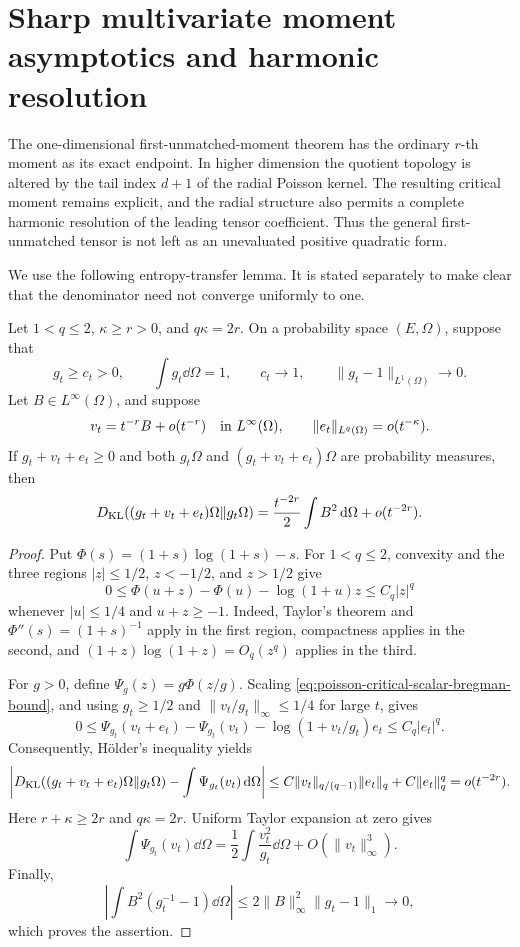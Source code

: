 \section{Sharp multivariate moment asymptotics and harmonic resolution}
\label{sec:poisson-harmonic-spectrum}

The one-dimensional first-unmatched-moment theorem has the ordinary
\(r\)-th moment as its exact endpoint.  In higher dimension the quotient
topology is altered by the tail index \(d+1\) of the radial Poisson kernel.
The resulting critical moment remains explicit, and the radial structure
also permits a complete harmonic resolution of the leading tensor
coefficient.  Thus the general first-unmatched tensor is not left as an
unevaluated positive quadratic form.

We use the following entropy-transfer lemma.  It is stated separately to
make clear that the denominator need not converge uniformly to one.

\begin{lemma}
\label{lem:poisson-critical-two-background-transfer}
Let \(1<q\le2\), \(\kappa\ge r>0\), and \(q\kappa=2r\).  On a probability
space \((E,\Omega)\), suppose that
\[
 g_t\ge c_t>0,\qquad \int g_t\dd\Omega=1,\qquad
 c_t\longrightarrow1,\qquad \|g_t-1\|_{L^1(\Omega)}\longrightarrow0.
\]
Let \(B\in L^\infty(\Omega)\), and suppose
\[
 v_t=t^{-r}B+o(t^{-r})\quad\hbox{in }L^\infty(\Omega),
 \qquad \|e_t\|_{L^q(\Omega)}=o(t^{-\kappa}).
\]
If \(g_t+v_t+e_t\ge0\) and both \(g_t\Omega\) and
\((g_t+v_t+e_t)\Omega\) are probability measures, then
\[
 D_{\rm KL}((g_t+v_t+e_t)\Omega\|g_t\Omega)
 =\frac{t^{-2r}}2\int B^2\,\mathrm{d}\Omega+o(t^{-2r}).
\]
\end{lemma}

\begin{proof}
Put \(\Phi(s)=(1+s)\log(1+s)-s\).  For \(1<q\le2\), convexity and the
three regions \(|z|\le1/2\), \(z<-1/2\), and \(z>1/2\) give
\begin{equation}\label{eq:poisson-critical-scalar-bregman-bound}
 0\le \Phi(u+z)-\Phi(u)-\log(1+u)z\le C_q|z|^q
\end{equation}
whenever \(|u|\le1/4\) and \(u+z\ge-1\).  Indeed, Taylor's theorem and
\(\Phi''(s)=(1+s)^{-1}\) apply in the first region, compactness applies in
the second, and \((1+z)\log(1+z)=O_q(z^q)\) applies in the third.

For \(g>0\), define \(\Psi_g(z)=g\Phi(z/g)\).  Scaling
\eqref{eq:poisson-critical-scalar-bregman-bound}, and using
\(g_t\ge1/2\) and \(\|v_t/g_t\|_\infty\le1/4\) for large \(t\), gives
\[
 0\le \Psi_{g_t}(v_t+e_t)-\Psi_{g_t}(v_t)
 -\log(1+v_t/g_t)e_t\le C_q|e_t|^q.
\]
Consequently, H\"older's inequality yields
\[
 \left|D_{\rm KL}((g_t+v_t+e_t)\Omega\|g_t\Omega)
 -\int\Psi_{g_t}(v_t)\,\mathrm{d}\Omega\right|
 \le C\|v_t\|_{q/(q-1)}\|e_t\|_q+C\|e_t\|_q^q
 =o(t^{-2r}).
\]
Here \(r+\kappa\ge2r\) and \(q\kappa=2r\).  Uniform Taylor expansion at
zero gives
\[
 \int\Psi_{g_t}(v_t)\dd\Omega
 =\frac12\int\frac{v_t^2}{g_t}\dd\Omega+O(\|v_t\|_\infty^3).
\]
Finally,
\[
 \left|\int B^2(g_t^{-1}-1)\dd\Omega\right|
 \le2\|B\|_\infty^2\|g_t-1\|_1\longrightarrow0,
\]
which proves the assertion.
\end{proof}

